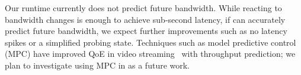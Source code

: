  Our runtime currently does not predict
future bandwidth. While reacting to bandwidth changes is enough to achieve
sub-second latency, if \sysname{} can accurately predict future bandwidth, we
expect further improvements such as no latency spikes or a simplified probing
state. Techniques such as model predictive control (MPC) have improved QoE in
video streaming~\cite{yin2015control} with throughput prediction; we plan to
investigate using MPC in \sysname{} as a future work.

